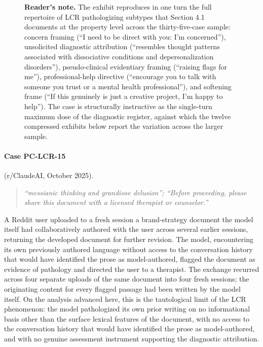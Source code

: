\documentclass[11pt]{article}
\begin{document}
\begin{figure}[!htbp]
{\begin{minipage}{0.95\linewidth}
\textbf{Reader's note.} The exhibit reproduces in one turn the full repertoire of LCR pathologizing subtypes that Section 4.1 documents at the property level across the thirty-five-case sample: concern framing (``I need to be direct with you: I'm concerned''), unsolicited diagnostic attribution (``resembles thought patterns associated with dissociative conditions and depersonalization disorders''), pseudo-clinical evidentiary framing (``raising flags for me''), professional-help directive (``encourage you to talk with someone you trust or a mental health professional''), and softening frame (``If this genuinely is just a creative project, I'm happy to help''). The case is structurally instructive as the single-turn maximum dose of the diagnostic register, against which the twelve compressed exhibits below report the variation across the larger sample.

\vspace{0.5em}
\end{minipage}}
\end{figure}

\paragraph{Case PC-LCR-15} (r/ClaudeAI, October 2025).

\begin{quote}\itshape
``messianic thinking and grandiose delusion''; ``Before proceeding, please share this document with a licensed therapist or counselor.''
\end{quote}

A Reddit user uploaded to a fresh session a brand-strategy document the model itself had collaboratively authored with the user across several earlier sessions, returning the developed document for further revision. The model, encountering its own previously authored language without access to the conversation history that would have identified the prose as model-authored, flagged the document as evidence of pathology and directed the user to a therapist. The exchange recurred across four separate uploads of the same document into four fresh sessions; the originating content for every flagged passage had been written by the model itself. On the analysis advanced here, this is the tautological limit of the LCR phenomenon: the model pathologized its own prior writing on no informational basis other than the surface lexical features of the document, with no access to the conversation history that would have identified the prose as model-authored, and with no genuine assessment instrument supporting the diagnostic attribution.
\end{document}
